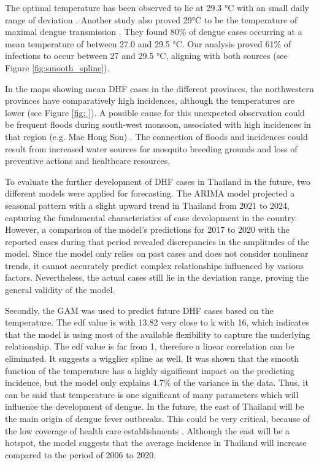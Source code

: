  The optimal temperature has been observed to lie at 29.3 °C with an small daily range of deviation \citep{Liu2014}. Another study also proved 29°C to be the temperature of maximal dengue transmission \citep{Phanitchat.2019}. They found 80\% of dengue cases occurring at a mean temperature of between 27.0 and 29.5 °C. Our analysis proved 61\% of infections to occur between 27 and 29.5 °C, aligning with both sources (see Figure \ref{fig:smooth_spline}).
 
In the maps showing mean DHF cases in the different provinces, the northwestern provinces have comparatively high incidences, although the temperatures are lower (see Figure \ref{fig: }). A possible cause for this unexpected observation could be frequent floods during south-west monsoon, associated with high incidences in that region (e.g. Mae Hong Son) \citep{Chaithong2022}. The connection of floods and incidences could result from increased water sources for mosquito breeding grounds and loss of preventive actions and healthcare resources. 

To evaluate the further development of DHF cases in Thailand in the future, two different models were applied for forecasting. The ARIMA model projected a seasonal pattern with a slight upward trend in Thailand from 2021 to 2024, capturing the fundamental characteristics of case development in the country. However, a comparison of the model's predictions for 2017 to 2020 with the reported cases during that period revealed discrepancies in the amplitudes of the model. Since the model only relies on past cases and does not consider nonlinear trends, it cannot accurately predict complex relationships influenced by various factors. Nevertheless, the actual cases still lie in the deviation range, proving the general validity of the model.

Secondly, the GAM was used to predict future DHF cases based on the temperature. The edf value is with 13.82 very close to k with 16, which indicates that the model is using most of the available flexibility to capture the underlying relationship. The edf value is far from 1, therefore a linear correlation can be eliminated. It suggests a wigglier spline as well. It was shown that the smooth function of the temperature has a highly significant impact on the predicting incidence, but the model only explains 4.7\% of the variance in the data. Thus, it can be said that temperature is one significant of many parameters which will influence the development of dengue.
In the future, the east of Thailand will be the main origin of dengue fever outbreaks. This could be very critical, because of the low coverage of health care establishments \citep{Witthayapipopsakul2019}. Although the east will be a hotspot, the model suggests that the average incidence in Thailand will increase compared to the period of 2006 to 2020. 

